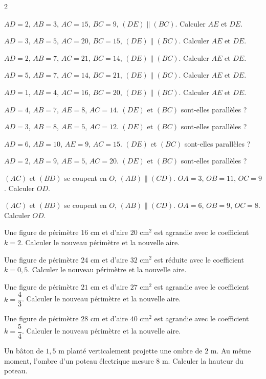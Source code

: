 \begin{multicols}{2}

\exo{} $AD=2$, $AB=3$, $AC=15$, $BC=9$, $(DE)\parallel(BC)$. Calculer $AE$ et $DE$.

\exo{} $AD=3$, $AB=5$, $AC=20$, $BC=15$, $(DE)\parallel(BC)$. Calculer $AE$ et $DE$.

\exo{} $AD=2$, $AB=7$, $AC=21$, $BC=14$, $(DE)\parallel(BC)$. Calculer $AE$ et $DE$.

\exo{} $AD=5$, $AB=7$, $AC=14$, $BC=21$, $(DE)\parallel(BC)$. Calculer $AE$ et $DE$.

\exo{} $AD=1$, $AB=4$, $AC=16$, $BC=20$, $(DE)\parallel(BC)$. Calculer $AE$ et $DE$.

\exo{} $AD=4$, $AB=7$, $AE=8$, $AC=14$. $(DE)$ et $(BC)$ sont-elles parallèles ?

\exo{} $AD=3$, $AB=8$, $AE=5$, $AC=12$. $(DE)$ et $(BC)$ sont-elles parallèles ?

\exo{} $AD=6$, $AB=10$, $AE=9$, $AC=15$. $(DE)$ et $(BC)$ sont-elles parallèles ?

\exo{} $AD=2$, $AB=9$, $AE=5$, $AC=20$. $(DE)$ et $(BC)$ sont-elles parallèles ?

\exo{} $(AC)$ et $(BD)$ se coupent en $O$, $(AB)\parallel(CD)$. $OA=3$, $OB=11$,
$OC=9$. Calculer $OD$.

\exo{} $(AC)$ et $(BD)$ se coupent en $O$, $(AB)\parallel(CD)$. $OA=6$, $OB=9$,
$OC=8$. Calculer $OD$.

\exo{} Une figure de périmètre $16$ cm et d'aire $20\text{ cm}^2$ est agrandie
avec le coefficient $k=2$. Calculer le nouveau périmètre et la nouvelle aire.

\exo{} Une figure de périmètre $24$ cm et d'aire $32\text{ cm}^2$ est réduite avec
le coefficient $k=0{,}5$. Calculer le nouveau périmètre et la nouvelle aire.

\exo{} Une figure de périmètre $21$ cm et d'aire $27\text{ cm}^2$ est agrandie avec
le coefficient $k=\dfrac43$. Calculer le nouveau périmètre et la nouvelle aire.

\exo{} Une figure de périmètre $28$ cm et d'aire $40\text{ cm}^2$ est agrandie avec
le coefficient $k=\dfrac54$. Calculer le nouveau périmètre et la nouvelle aire.

\exo{} Un bâton de $1{,}5$ m planté verticalement projette une ombre de $2$ m. Au
même moment, l'ombre d'un poteau électrique mesure $8$ m. Calculer la hauteur du poteau.


\end{multicols}
